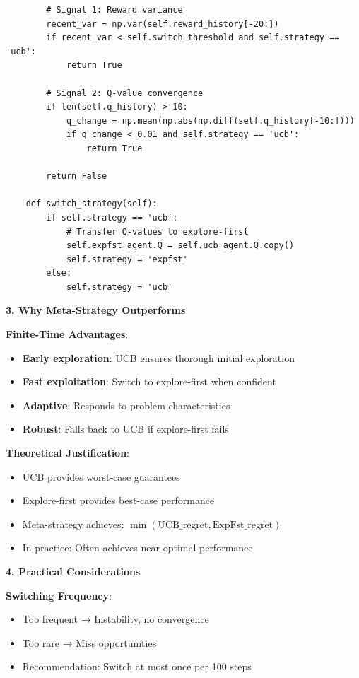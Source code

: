 \documentclass[12pt]{article}
\begin{document}
{{{\begin{verbatim}
        # Signal 1: Reward variance
        recent_var = np.var(self.reward_history[-20:])
        if recent_var < self.switch_threshold and self.strategy == 'ucb':
            return True
            
        # Signal 2: Q-value convergence
        if len(self.q_history) > 10:
            q_change = np.mean(np.abs(np.diff(self.q_history[-10:])))
            if q_change < 0.01 and self.strategy == 'ucb':
                return True
                
        return False
        
    def switch_strategy(self):
        if self.strategy == 'ucb':
            # Transfer Q-values to explore-first
            self.expfst_agent.Q = self.ucb_agent.Q.copy()
            self.strategy = 'expfst'
        else:
            self.strategy = 'ucb'
\end{verbatim}

\textbf{3. Why Meta-Strategy Outperforms}

\textbf{Finite-Time Advantages}:
\begin{itemize}
\item \textbf{Early exploration}: UCB ensures thorough initial exploration
\item \textbf{Fast exploitation}: Switch to explore-first when confident
\item \textbf{Adaptive}: Responds to problem characteristics
\item \textbf{Robust}: Falls back to UCB if explore-first fails
\end{itemize}

\textbf{Theoretical Justification}:
\begin{itemize}
\item UCB provides worst-case guarantees
\item Explore-first provides best-case performance
\item Meta-strategy achieves: $\min(\text{UCB\_regret}, \text{ExpFst\_regret})$
\item In practice: Often achieves near-optimal performance
\end{itemize}

\textbf{4. Practical Considerations}

\textbf{Switching Frequency}:
\begin{itemize}
\item Too frequent → Instability, no convergence
\item Too rare → Miss opportunities
\item Recommendation: Switch at most once per 100 steps
\end{itemize}

}}}
\end{document}
